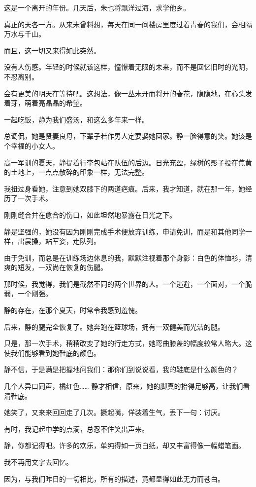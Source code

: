 		\vspace{1em}
		这是一个离开的年份。几天后，朱也将飘洋过海，求学他乡。\par
		真正的天各一方。从来未曾料想，每天在同一间楼房里度过着青春的我们，会相隔万水与千山。\par
		而且，这一切又来得如此突然。\par
		没有人伤感。年轻的时候就该这样，憧憬着无限的未来，而不是回忆旧时的光阴，不忍离别。\par
		会有更美的明天在等待吧。这想法，像一丛未开而将开的春花，隐隐地，在心头发着芽，萌着亮晶晶的希望。\par
		一起吃饭，静为我们盛汤，和这么多年来一样。\par
		总调侃，她是贤妻良母，下辈子若作男人定要娶她回家。静一脸得意的笑。她该是个幸福的小女人。\par
		高一军训的夏天，静提着行李包站在队伍的后边。日光充盈，绿树的影子投在焦黄的土地上，一点点散碎的印象一样，无法完整。\par
		我扭过身看她，注意到她双膝下的两道疤痕。后来，我才知道，就在那一年，她经历了一次手术。\par
		刚刚缝合并在愈合的伤口，如此坦然地暴露在日光之下。\par
		静是坚强的，她没有因为刚刚完成手术便放弃训练，申请免训，而是和其他同学一样，出晨操，站军姿，走队列。\par
		由于免训，而总是在训练场边休息的我，默默注视着那个身影：白色的体恤衫，清爽的短发，一双尚在恢复的伤腿。\par
		那时候，我觉得，我们是截然不同的两个世界的人。一个逃避，一个面对，一个脆弱，一个刚强。\par
		静的存在，在那个夏天，时常令我感到羞愧。\par
		后来，静的腿完全恢复了。她奔跑在篮球场，拥有一双健美而光洁的腿。\par
		只是，那一次手术，稍稍改变了她的行走方式，她弯曲膝盖的幅度较常人略大。这使我们能够看到她鞋底的颜色。\par
		静不信，于是满是把握地问我们：那你们到说说看，我的鞋底是什么颜色的？\par
		几个人异口同声，橘红色…… 静才相信，原来，她的脚真的抬得足够高，让我们看清鞋底。\par
		她笑了，又来来回回走了几次。撅起嘴，佯装着生气，丢下一句：讨厌。\par
		有时，我记起中学的点滴，总忍不住笑出声来。\par
		静，你都记得吧。许多的欢乐，单纯得如一页白纸，却又丰富得像一幅蜡笔画。\par
		我不再用文字去回忆。\par
		因为，与我们昨日的一切相比，所有的描述，竟都显得如此无力而苍白。


